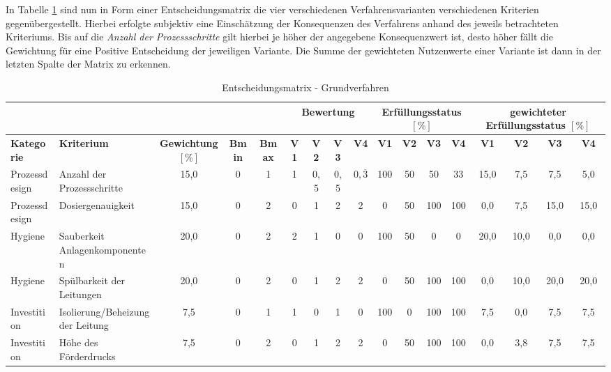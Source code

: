In Tabelle \ref{esm:grundverfahren} sind nun in Form einer Entscheidungsmatrix die vier verschiedenen Verfahrensvarianten verschiedenen Kriterien gegenübergestellt. Hierbei erfolgte subjektiv eine Einschätzung der Konsequenzen des Verfahrens anhand des jeweils betrachteten Kriteriums. Bis auf die \textit{Anzahl der Prozessschritte} gilt hierbei je höher der angegebene Konsequenzwert ist, desto höher fällt die Gewichtung für eine Positive Entscheidung der jeweiligen Variante. Die Summe der gewichteten Nutzenwerte einer Variante ist dann in der letzten Spalte der Matrix zu erkennen. 



\begin{table}
	\begin{adjustbox}{max width=\textwidth}
	\begin{threeparttable}
	\renewcommand*{\arraystretch}{1.2}
	\centering
	\caption{Entscheidungsmatrix - Grundverfahren}
	\label{esm:grundverfahren}
		\begin{tabular}{l|l|c|c|c|cccc|cccc|cccc}
			\hline
			\multicolumn{5}{c|}{}&\multicolumn{4}{c|}{\textbf{Bewertung}}	&  \multicolumn{4}{c|}{\textbf{Erfüllungsstatus} $\left[\si{\percent}\right]$} & \multicolumn{4}{c}{\textbf{gewichteter Erfüllungsstatus} $\left[\si{\percent}\right]$}\\
			\hline
			\textbf{Kategorie} & \textbf{Kriterium} & \textbf{Gewichtung $\left[\si{\percent}\right]$}& \textbf{Bmin}&\textbf{Bmax}&\textbf{V1} & \textbf{V2} & \textbf{V3} & \textbf{V4} & \textbf{V1} & \textbf{V2} & \textbf{V3} & \textbf{V4}& \textbf{V1} & \textbf{V2} & \textbf{V3} & \textbf{V4}\\
			\hline
			Prozessdesign & Anzahl der Prozessschritte 		&15,0 	&0&1	&1&0,5&0,5&$0,\overline{3}$&100&50&50&33	&15,0&7,5&7,5&5,0\\
			Prozessdesign&Dosiergenauigkeit					&15,0	&0&2	&0&1&2&2&0&50&100&100	&0,0&7,5&15,0&15,0\\
			Hygiene & Sauberkeit Anlagenkomponenten 		&20,0	&0&2	&2&1&0&0&100&50&0&0		&20,0&10,0&0,0&0,0\\
			Hygiene&Spülbarkeit der Leitungen				&20,0	&0&2	&0&1&2&2&0&50&100&100	&0,0&10,0&20,0&20,0\\
			Investition& Isolierung/Beheizung der Leitung	&7,5	&0&1	&1&0&1&0&100&0&100&100	&7,5&0,0&7,5&7,5\\
			Investition&Höhe des Förderdrucks				&7,5	&0&2	&0&1&2&2&0&50&100&100	&0,0&3,8&7,5&7,5\\

\end{tabular}
\end{threeparttable}
\end{adjustbox}
\end{table}
